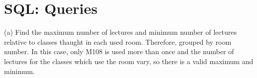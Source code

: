 \documentclass[11pt, english]{article}
\begin{document}
%
\newpage

\section{SQL: Queries}

	(a) Find the maximum number of lectures and minimum number of lectures relative to classes thaught in each used room. Therefore, grouped by room number. In this case, only M108 is used more than once and the number of lectures for the classes which use the room vary, so there is a valid maximum and minimum.
\end{document}

